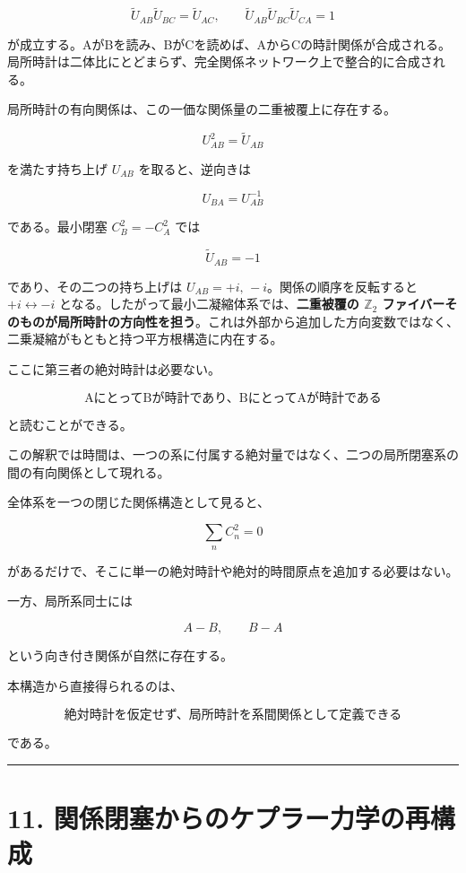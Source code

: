 \documentclass[
  a4paper,
]{ltjsarticle}
\begin{document}
\[
\boxed{
\tilde U_{AB}\tilde U_{BC}=\tilde U_{AC}
},
\qquad
\boxed{
\tilde U_{AB}\tilde U_{BC}\tilde U_{CA}=1
}
\]

が成立する。AがBを読み、BがCを読めば、AからCの時計関係が合成される。局所時計は二体比にとどまらず、完全関係ネットワーク上で整合的に合成される。

局所時計の有向関係は、この一価な関係量の二重被覆上に存在する。

\[
\boxed{
U_{AB}^2=\tilde U_{AB}
}
\]

を満たす持ち上げ \(U_{AB}\) を取ると、逆向きは

\[
\boxed{
U_{BA}=U_{AB}^{-1}
}
\]

である。最小閉塞 \(C_B^2=-C_A^2\) では

\[
\tilde U_{AB}=-1
\]

であり、その二つの持ち上げは \(U_{AB}=+i,\,-i\)。関係の順序を反転すると
\(+i\leftrightarrow-i\)
となる。したがって最小二凝縮体系では、\textbf{二重被覆の \(\mathbb Z_2\)
ファイバーそのものが局所時計の方向性を担う}。これは外部から追加した方向変数ではなく、二乗凝縮がもともと持つ平方根構造に内在する。

ここに第三者の絶対時計は必要ない。

\[
\boxed{
\text{AにとってBが時計であり、BにとってAが時計である}
}
\]

と読むことができる。

この解釈では時間は、一つの系に付属する絶対量ではなく、二つの局所閉塞系の間の有向関係として現れる。

全体系を一つの閉じた関係構造として見ると、

\[
\sum_n C_n^2=0
\]

があるだけで、そこに単一の絶対時計や絶対的時間原点を追加する必要はない。

一方、局所系同士には

\[
A-B,\qquad B-A
\]

という向き付き関係が自然に存在する。

本構造から直接得られるのは、

\[
\boxed{
\text{絶対時計を仮定せず、局所時計を系間関係として定義できる}
}
\]

である。

\begin{center}\rule{0.5\linewidth}{0.5pt}\end{center}

\section{11.
関係閉塞からのケプラー力学の再構成}\label{ux95a2ux4fc2ux9589ux585eux304bux3089ux306eux30b1ux30d7ux30e9ux30fcux529bux5b66ux306eux518dux69cbux6210}
\end{document}
